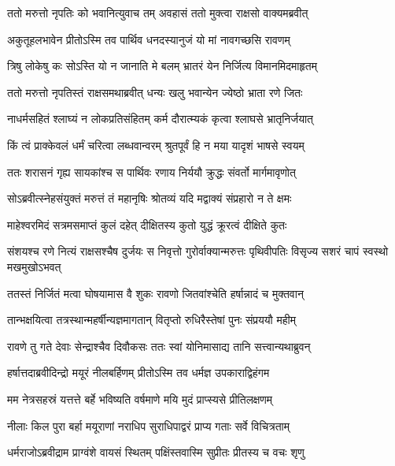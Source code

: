 \twolineshloka
{ततो मरुत्तो नृपतिः को भवानित्युवाच तम्}
{अवहासं ततो मुक्त्वा राक्षसो वाक्यमब्रवीत्} %

\twolineshloka
{अकुतूहलभावेन प्रीतोऽस्मि तव पार्थिव}
{धनदस्यानुजं यो मां नावगच्छसि रावणम्} %

\twolineshloka
{त्रिषु लोकेषु कः सोऽस्ति यो न जानाति मे बलम्}
{भ्रातरं येन निर्जित्य विमानमिदमाहृतम्} %

\twolineshloka
{ततो मरुत्तो नृपतिस्तं राक्षसमथाब्रवीत्}
{धन्यः खलु भवान्येन ज्येष्ठो भ्राता रणे जितः} %

\twolineshloka
{नाधर्मसहितं श्लाघ्यं न लोकप्रतिसंहितम्}
{कर्म दौरात्म्यकं कृत्वा श्लाघसे भ्रातृनिर्जयात्} %

\twolineshloka
{किं त्वं प्राक्केवलं धर्मं चरित्वा लब्धवान्वरम्}
{श्रुतपूर्वं हि न मया यादृशं भाषसे स्वयम्} %

\twolineshloka
{ततः शरासनं गृह्य सायकांश्च स पार्थिवः}
{रणाय निर्ययौ क्रुद्धः संवर्तो मार्गमावृणोत्} %

\twolineshloka
{सोऽब्रवीत्स्नेहसंयुक्तं मरुत्तं तं महानृषिः}
{श्रोतव्यं यदि मद्वाक्यं संप्रहारो न ते क्षमः} %

\twolineshloka
{माहेश्वरमिदं सत्रमसमाप्तं कुलं दहेत्}
{दीक्षितस्य कुतो युद्धं क्रूरत्वं दीक्षिते कुतः} %

\threelineshloka
{संशयश्च रणे नित्यं राक्षसश्चैष दुर्जयः}
{स निवृत्तो गुरोर्वाक्यान्मरुत्तः पृथिवीपतिः}
{विसृज्य सशरं चापं स्वस्थो मखमुखोऽभवत्} %

\twolineshloka
{ततस्तं निर्जितं मत्वा घोषयामास वै शुकः}
{रावणो जितवांश्चेति हर्षान्नादं च मुक्तवान्} %

\twolineshloka
{तान्भक्षयित्वा तत्रस्थान्महर्षीन्यज्ञमागतान्}
{वितृप्तो रुधिरैस्तेषां पुनः संप्रययौ महीम्} %

\twolineshloka
{रावणे तु गते देवाः सेन्द्राश्चैव दिवौकसः}
{ततः स्वां योनिमासाद्य तानि सत्त्वान्यथाब्रुवन्} %

\twolineshloka
{हर्षात्तदाब्रवीदिन्द्रो मयूरं नीलबर्हिणम्}
{प्रीतोऽस्मि तव धर्मज्ञ उपकाराद्विहंगम} %

\twolineshloka
{मम नेत्रसहस्रं यत्तत्ते बर्हे भविष्यति}
{वर्षमाणे मयि मुदं प्राप्स्यसे प्रीतिलक्षणम्} %

\twolineshloka
{नीलाः किल पुरा बर्हा मयूराणां नराधिप}
{सुराधिपाद्वरं प्राप्य गताः सर्वे विचित्रताम्} %

\twolineshloka
{धर्मराजोऽब्रवीद्राम प्राग्वंशे वायसं स्थितम्}
{पक्षिंस्तवास्मि सुप्रीतः प्रीतस्य च वचः शृणु} %

